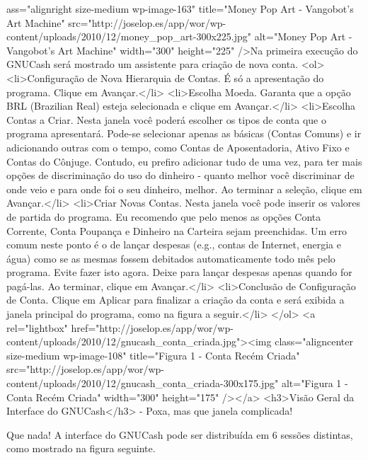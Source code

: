 ass="alignright size-medium wp-image-163" title="Money Pop Art - Vangobot's Art Machine" src="http://joselop.es/app/wor/wp-content/uploads/2010/12/money_pop_art-300x225.jpg" alt="Money Pop Art - Vangobot's Art Machine" width="300" height="225" />Na primeira execução do GNUCash será mostrado um assistente para criação de nova conta.
<ol>
    <li>Configuração de Nova Hierarquia de Contas. É só a apresentação do programa. Clique em Avançar.</li>
    <li>Escolha Moeda. Garanta que a opção BRL (Brazilian Real) esteja selecionada e clique em Avançar.</li>
    <li>Escolha Contas a Criar. Nesta janela você poderá escolher os tipos de conta que o programa apresentará. Pode-se selecionar apenas as básicas (Contas Comuns) e ir adicionando outras com o tempo, como Contas de Aposentadoria, Ativo Fixo e Contas do Cônjuge. Contudo, eu prefiro adicionar tudo de uma vez, para ter mais opções de discriminação do uso do dinheiro - quanto melhor você discriminar de onde veio e para onde foi o seu dinheiro, melhor. Ao terminar a seleção, clique em Avançar.</li>
    <li>Criar Novas Contas. Nesta janela você pode inserir os valores de partida do programa. Eu recomendo que pelo menos as opções Conta Corrente, Conta Poupança e Dinheiro na Carteira sejam preenchidas. Um erro comum neste ponto é o de lançar despesas (e.g., contas de Internet, energia e água) como se as mesmas fossem debitados automaticamente todo mês pelo programa. Evite fazer isto agora. Deixe para lançar despesas apenas quando for pagá-las. Ao terminar, clique em Avançar.</li>
    <li>Conclusão de Configuração de Conta. Clique em Aplicar para finalizar a criação da conta e será exibida a janela principal do programa, como na figura a seguir.</li>
</ol>
<a rel="lightbox" href="http://joselop.es/app/wor/wp-content/uploads/2010/12/gnucash_conta_criada.jpg"><img class="aligncenter size-medium wp-image-108" title="Figura 1 - Conta Recém Criada" src="http://joselop.es/app/wor/wp-content/uploads/2010/12/gnucash_conta_criada-300x175.jpg" alt="Figura 1 - Conta Recém Criada" width="300" height="175" /></a>
<h3>Visão Geral da Interface do GNUCash</h3>
- Poxa, mas que janela complicada!

Que nada! A interface do GNUCash pode ser distribuída em 6 sessões distintas, como mostrado na figura seguinte.

